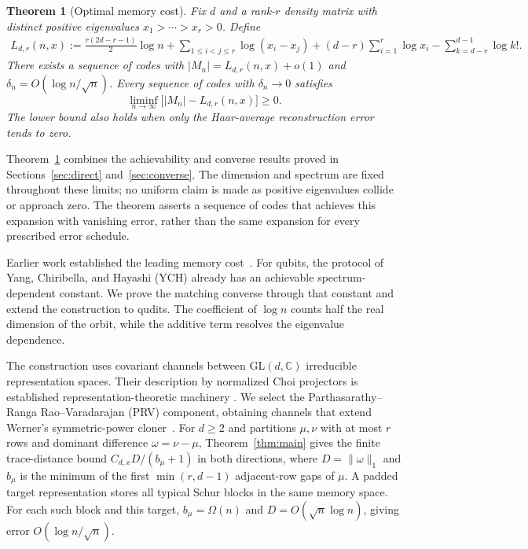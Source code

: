 \documentclass[a4paper,onecolumn,11pt]{quantumarticle}
\newtheorem{thm}{Theorem}
\begin{document}
\begin{thm}[Optimal memory cost]\label{thm:qmdl}
Fix $d$ and a rank-$r$ density matrix with distinct positive eigenvalues $x_1>\cdots>x_r>0$. Define
\begin{align}
L_{d,r}(n,x):=\frac{r(2d-r-1)}2\log n
+\sum_{1\le i<j\le r}\log(x_i-x_j)+(d-r)\sum_{i=1}^r\log x_i
-\sum_{k=d-r}^{d-1}\log k! .\label{eq:result}
\end{align}
There exists a sequence of codes with $|M_n|=L_{d,r}(n,x)+o(1)$ and $\delta_n=O(\log n/\sqrt n)$. Every sequence of codes with $\delta_n\to0$ satisfies
\[
\liminf_{n\to\infty}\bigl[|M_n|-L_{d,r}(n,x)\bigr]\ge0.
\]
The lower bound also holds when only the Haar-average reconstruction
error tends to zero.
\end{thm}
Theorem~\ref{thm:qmdl} combines the achievability and converse results proved in Sections~\ref{sec:direct} and~\ref{sec:converse}. The dimension and spectrum are fixed throughout these limits; no uniform claim is made as positive eigenvalues collide or approach zero. The theorem asserts a sequence of codes that achieves this expansion with vanishing error, rather than the same expansion for every prescribed error schedule.

Earlier work established the leading memory cost~\cite{yang2016optimal,yang2018compression}. For qubits, the protocol of Yang, Chiribella, and Hayashi (YCH) already has an achievable spectrum-dependent constant. We prove the matching converse through that constant and extend the construction to qudits. The coefficient of $\log n$ counts half the real dimension of the orbit, while the additive term resolves the eigenvalue dependence.

The construction uses covariant channels between
$\mathrm{GL}(d,\mathbb C)$ irreducible representation spaces.
Their description by normalized Choi projectors is established
representation-theoretic machinery
\cite{gschwendtner2021programmability,lee2022quantum,aschieri2024equivariant}.
We select the Parthasarathy--Ranga Rao--Varadarajan (PRV) component,
obtaining channels that extend Werner's symmetric-power
cloner~\cite{werner1998optimal}. For $d\ge2$ and partitions
$\mu,\nu$ with at most $r$ rows and dominant difference
$\omega=\nu-\mu$, Theorem~\ref{thm:main} gives
the finite trace-distance bound $C_{d,x}D/(b_\mu+1)$ in both
directions, where $D=\|\omega\|_1$ and $b_\mu$ is the minimum of
the first $\min(r,d-1)$ adjacent-row gaps of $\mu$.
A padded target representation stores all typical Schur blocks in
the same memory space. For each such block and this target,
$b_\mu=\Omega(n)$ and $D=O(\sqrt n\log n)$, giving error
$O(\log n/\sqrt n)$.
\end{document}
